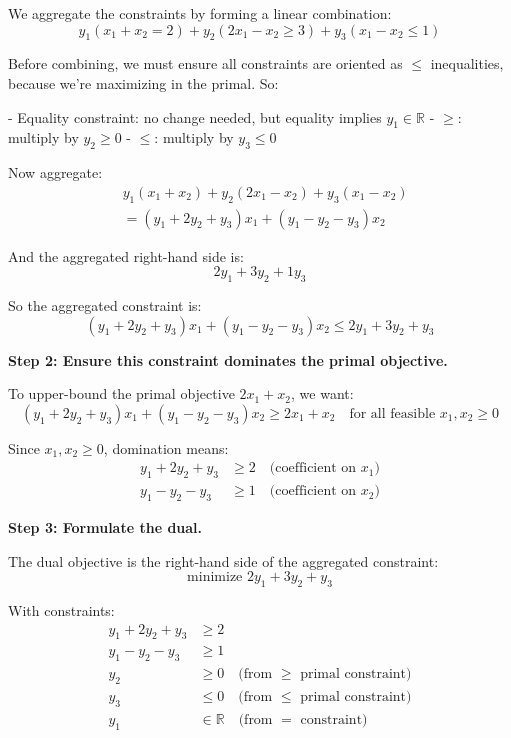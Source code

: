 We aggregate the constraints by forming a linear combination:
\[
y_1(x_1 + x_2 = 2) + y_2(2x_1 - x_2 \geq 3) + y_3(x_1 - x_2 \leq 1)
\]

Before combining, we must ensure all constraints are oriented as \( \leq \) inequalities, because we're maximizing in the primal. So:

- Equality constraint: no change needed, but equality implies \( y_1 \in \mathbb{R} \)
- \( \geq \): multiply by \( y_2 \geq 0 \)
- \( \leq \): multiply by \( y_3 \leq 0 \)

Now aggregate:
\[
\begin{aligned}
& y_1(x_1 + x_2) + y_2(2x_1 - x_2) + y_3(x_1 - x_2) \\
&= (y_1 + 2y_2 + y_3)x_1 + (y_1 - y_2 - y_3)x_2
\end{aligned}
\]

And the aggregated right-hand side is:
\[
2y_1 + 3y_2 + 1y_3
\]

So the aggregated constraint is:
\[
(y_1 + 2y_2 + y_3)x_1 + (y_1 - y_2 - y_3)x_2 \leq 2y_1 + 3y_2 + y_3
\]

\vspace{0.5em}
\textbf{Step 2: Ensure this constraint dominates the primal objective.}

To upper-bound the primal objective \( 2x_1 + x_2 \), we want:
\[
(y_1 + 2y_2 + y_3)x_1 + (y_1 - y_2 - y_3)x_2 \geq 2x_1 + x_2 \quad \text{for all feasible } x_1, x_2 \geq 0
\]

Since \( x_1, x_2 \geq 0 \), domination means:
\[
\begin{aligned}
y_1 + 2y_2 + y_3 &\geq 2 \quad \text{(coefficient on } x_1) \\
y_1 - y_2 - y_3 &\geq 1 \quad \text{(coefficient on } x_2)
\end{aligned}
\]

\vspace{0.5em}
\textbf{Step 3: Formulate the dual.}

The dual objective is the right-hand side of the aggregated constraint:
\[
\text{minimize } 2y_1 + 3y_2 + y_3
\]

With constraints:
\[
\begin{aligned}
y_1 + 2y_2 + y_3 &\geq 2 \\
y_1 - y_2 - y_3 &\geq 1 \\
y_2 &\geq 0 \quad \text{(from } \geq \text{ primal constraint)} \\
y_3 &\leq 0 \quad \text{(from } \leq \text{ primal constraint)} \\
y_1 &\in \mathbb{R} \quad \text{(from } = \text{ constraint)}
\end{aligned}
\]

